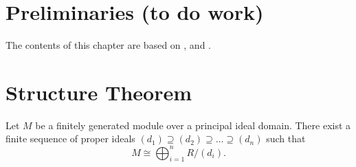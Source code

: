\section{Preliminaries (to do work)}
The contents of this chapter are based on \cite{nanda}, \cite{polterovich} and \cite{wang}.

\begin{definition}
    
\end{definition}

\begin{definition}
    
\end{definition}

\begin{definition}
    
\end{definition}

\begin{definition}
    
\end{definition}

\begin{definition}[Barcode]

\end{definition}

\begin{definition}
    
\end{definition}

\begin{definition}
    
\end{definition}

\begin{definition}
    
\end{definition}

\begin{definition}
    
\end{definition}

\section{Structure Theorem}
\begin{fact} \label{structure-pure}
    Let $ M $ be a  finitely generated module over a principal ideal domain. There exist a finite sequence of proper ideals $ (d_1) \supseteq (d_2) \supseteq \dots \supseteq (d_n) $ such that
    $$
        M \cong \bigoplus_{i=1}^n R / (d_i).
    $$

\end{fact}

